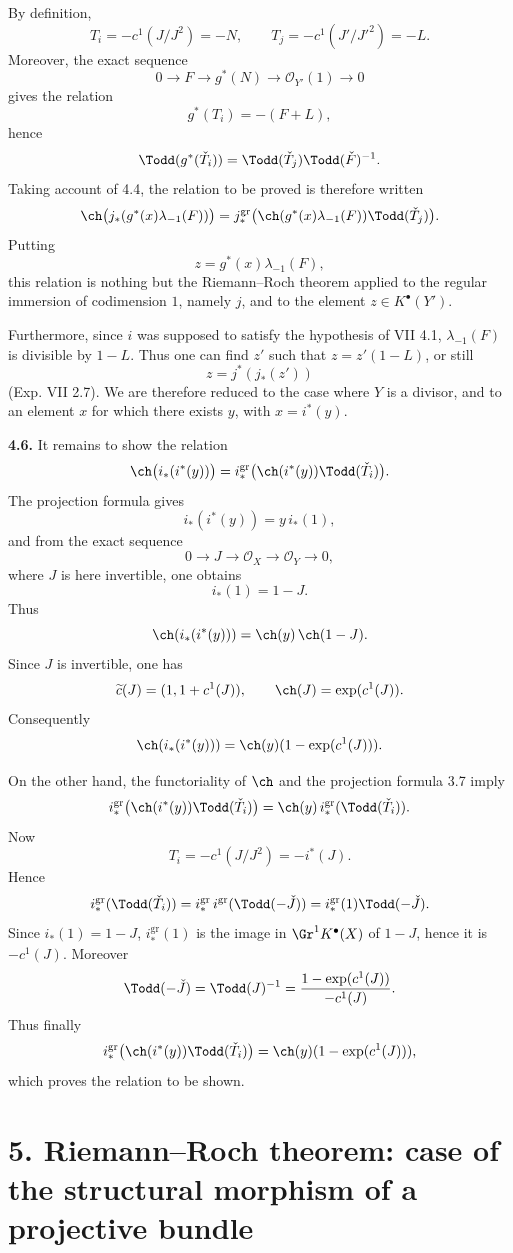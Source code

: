 By definition,
\[
 T_i=-c^1(J/J^2)=-N,\qquad
 T_j=-c^1(J'/J'^2)=-L.
\]
Moreover, the exact sequence
\[
0\longrightarrow F\longrightarrow g^*(N)\longrightarrow \mathcal O_{Y'}(1)\longrightarrow0
\]
gives the relation
\[
 g^*(T_i)=-(F+L),
\]
hence
\[
 \Todd(g^*(\check T_i))=\Todd(\check T_j)\Todd(\check F)^{-1}.
\]
Taking account of 4.4, the relation to be proved is therefore written
\[
 \ch\bigl(j_*(g^*(x)\lambda_{-1}(F))\bigr)
 =
 j^{\mathrm{gr}}_*\bigl(\ch(g^*(x)\lambda_{-1}(F))\Todd(\check T_j)\bigr).
\]
Putting
\[
z=g^*(x)\lambda_{-1}(F),
\]
this relation is nothing but the Riemann--Roch theorem applied to the regular immersion of codimension \(1\), namely \(j\), and to the element \(z\in K^{\bullet}(Y')\).

Furthermore, since \(i\) was supposed to satisfy the hypothesis of VII 4.1, \(\lambda_{-1}(F)\) is divisible by \(1-L\). Thus one can find \(z'\) such that \(z=z'(1-L)\), or still
\[
 z=j^*(j_*(z'))
\]
(Exp. VII 2.7). We are therefore reduced to the case where \(Y\) is a divisor, and to an element \(x\) for which there exists \(y\), with \(x=i^*(y)\).

\textbf{4.6.} It remains to show the relation
\[
 \ch\bigl(i_*(i^*(y))\bigr)
 =
 i^{\mathrm{gr}}_*\bigl(\ch(i^*(y))\Todd(\check T_i)\bigr).
\]
The projection formula gives
\[
 i_*(i^*(y))=y\,i_*(1),
\]
and from the exact sequence
\[
0\longrightarrow J\longrightarrow\mathcal O_X\longrightarrow\mathcal O_Y\longrightarrow0,
\]
where \(J\) is here invertible, one obtains
\[
 i_*(1)=1-J.
\]
Thus
\[
 \ch(i_*(i^*(y)))=\ch(y)\,\ch(1-J).
\]
Since \(J\) is invertible, one has
\[
 \widetilde c(J)=(1,1+c^1(J)),\qquad \ch(J)=\exp(c^1(J)).
\]
Consequently
\[
 \ch(i_*(i^*(y)))=\ch(y)(1-\exp(c^1(J))).
\]

On the other hand, the functoriality of \(\ch\) and the projection formula 3.7 imply
\[
 i^{\mathrm{gr}}_*\bigl(\ch(i^*(y))\Todd(\check T_i)\bigr)
 =
 \ch(y)\,i^{\mathrm{gr}}_*(\Todd(\check T_i)).
\]
Now
\[
T_i=-c^1(J/J^2)=-i^*(J).
\]
Hence
\[
 i^{\mathrm{gr}}_*(\Todd(\check T_i))
 =
 i^{\mathrm{gr}}_*\,i^{\mathrm{gr}}(\Todd(-\check J))
 =
 i^{\mathrm{gr}}_*(1)\Todd(-\check J).
\]
Since \(i_*(1)=1-J\), \(i^{\mathrm{gr}}_*(1)\) is the image in \(\Gr^1K^{\bullet}(X)\) of \(1-J\), hence it is \(-c^1(J)\). Moreover
\[
 \Todd(-\check J)=\Todd(J)^{-1}
 =
 \frac{1-\exp(c^1(J))}{-c^1(J)}.
\]
Thus finally
\[
 i^{\mathrm{gr}}_*\bigl(\ch(i^*(y))\Todd(\check T_i)\bigr)
 =
 \ch(y)(1-\exp(c^1(J))),
\]
which proves the relation to be shown.

\section*{5. Riemann--Roch theorem: case of the structural morphism of a projective bundle}


